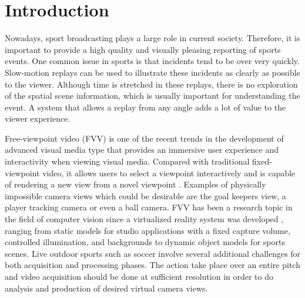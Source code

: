 \section{Introduction}
Nowadays, sport broadcasting plays a large role in current society.
Therefore, it is important to provide a high quality and visually pleasing reporting of sports events.
One common issue in sports is that incidents tend to be over very quickly.
Slow-motion replays can be used to illustrate these incidents as clearly as possible to the viewer. 
Although time is stretched in these replays, there is no exploration of the spatial scene information, which is 
usually important for understanding the event.
A system that allows a replay from any angle adds a lot of value to the viewer experience.



Free-viewpoint video (FVV) is one of the recent trends in the development of advanced visual media type
that provides an immersive user experience and interactivity when viewing
visual media. Compared with traditional fixed-viewpoint
video, it allows users to select a viewpoint interactively and
is capable of rendering a new view from a novel viewpoint \cite{05_plane_sweeping}.
Examples of physically impossible camera views which
could be desirable are the goal keepers view, a player tracking camera or even a
ball camera.
FVV has been a research topic in the field of computer vision 
since a virtualized reality system was developed \cite{04_fast_FVV_01},
ranging from static models for studio applications with a fixed
capture volume, controlled illumination, and backgrounds \cite{02_iview} 
to dynamic object models for sports scenes.
Live outdoor sports such as soccer involve several additional challenges for both acquisition and processing 
phases. 
The action take place over an entire pitch and video acquisition should be done at sufficient resolution in order to
do analysis and production of desired virtual camera views.

